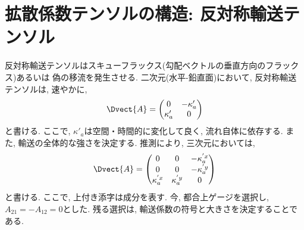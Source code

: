 \section{拡散係数テンソルの構造: 反対称輸送テンソル}
反対称輸送テンソルはスキューフラックス(勾配ベクトルの垂直方向のフラックス)あるいは
偽の移流を発生させる. 
二次元(水平-鉛直面)において, 反対称輸送テンソルは, 速やかに, 
\begin{equation}
  \Dvect{A} =
\begin{pmatrix}
  0 &-\kappa'_a \\
  \kappa'_a &0
\end{pmatrix}
\end{equation}
と書ける. 
ここで, $\kappa'_a$は空間・時間的に変化して良く, 流れ自体に依存する. 
また, 輸送の全体的な強さを決定する. 
推測により, 三次元においては, 
\begin{equation}
  \Dvect{A} =
\begin{pmatrix}
  0 &0 &-\kappa_a^{'x} \\
  0 &0 &-\kappa_a^{'y} \\
  \kappa_a^{'x} &\kappa_a^{'y} &0
\end{pmatrix}
\end{equation}
と書ける. 
ここで, 上付き添字は成分を表す. 
今, 都合上ゲージを選択し, $A_{21}=-A_{12}=0$とした. 
残る選択は, 輸送係数の符号と大きさを決定することである. 

